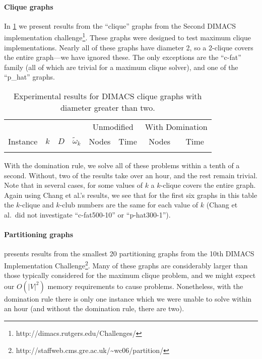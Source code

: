 \documentclass[letterpaper]{article}
\begin{document}
\paragraph{Clique graphs}

In \cref{table:clique} we present results from the ``clique'' graphs from the
Second DIMACS implementation challenge\footnote{http://dimacs.rutgers.edu/Challenges/}. These
graphs were designed to test maximum clique implementations. Nearly all of these graphs have
diameter 2, so a 2-clique covers the entire graph---we have ignored these. The only exceptions are
the ``c-fat'' family (all of which are trivial for a maximum clique solver), and one of the
``p\_hat'' graphs.

\begin{table}
    \scriptsize\setlength{\tabcolsep}{5pt} %
    \centering
    \begin{tabular}{l c rr rr rr}
        \toprule
        & & & & \multicolumn{2}{c}{Unmodified} & \multicolumn{2}{c}{With Domination} \\
    \cmidrule(lr){5-6}
    \cmidrule(lr){7-8}
    Instance & \multicolumn{1}{c}{$k$} & \multicolumn{1}{c}{$D$} & \multicolumn{1}{c}{$\tilde{\omega}_k$} &
    \multicolumn{1}{c}{Nodes} & \multicolumn{1}{c}{Time} &
    \multicolumn{1}{c}{Nodes} & \multicolumn{1}{c}{Time} \\
    \midrule
    {gen-table-dimacs}
    \bottomrule
\end{tabular}
\caption{Experimental results for DIMACS clique graphs with diameter greater
    than two.}\label{table:clique}
\end{table}

With the domination rule, we solve all of these problems within a tenth of a second. Without, two of
the results take over an hour, and the rest remain trivial. Note that in several cases, for some
values of $k$ a $k$-clique covers the entire graph.  Again using Chang et al.'s results, we see that for the first six graphs in this table the $k$-clique and $k$-club
numbers are the same for each value of $k$ (Chang et al.\ did not investigate ``c-fat500-10'' or
``p-hat300-1'').

\paragraph{Partitioning graphs}

 presents results from the smallest 20 partitioning graphs
from the 10th DIMACS Implementation
Challenge\footnote{http://staffweb.cms.gre.ac.uk/\textasciitilde{}wc06/partition/}.  Many of these graphs are
considerably larger than those typically considered for the maximum clique problem, and we might
expect our $O(|V|^2)$ memory requirements to cause problems. Nonetheless, with the domination rule
there is only one instance which we were unable to solve within an hour (and without the domination
rule, there are two).
\end{document}
